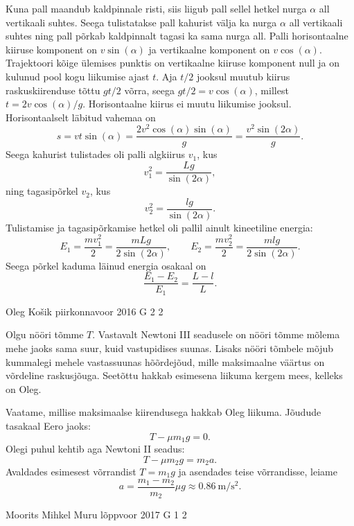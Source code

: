 \documentclass[11pt, twoside]{article}
\begin{document}
{{\ifSolution
Kuna pall maandub kaldpinnale risti, siis liigub pall sellel hetkel nurga $\alpha$ all vertikaali suhtes. Seega tulistatakse pall kahurist välja ka nurga $\alpha$ all vertikaali suhtes ning pall põrkab kaldpinnalt tagasi ka sama nurga all. Palli horisontaalne kiiruse komponent on $v\sin(\alpha)$ ja vertikaalne komponent on $v\cos(\alpha)$. Trajektoori kõige ülemises punktis on vertikaalne kiiruse komponent null ja on kulunud pool kogu liikumise ajast $t$. Aja $t/2$ jooksul muutub kiirus raskuskiirenduse tõttu $gt/2$ võrra, seega $gt/2 =v\cos(\alpha)$, millest $t=2v\cos(\alpha)/g$. Horisontaalne kiirus ei muutu liikumise jooksul. Horisontaalselt läbitud vahemaa on $$s=vt\sin(\alpha)=\frac{2v^2\cos(\alpha)\sin(\alpha)}{g} = \frac{v^2\sin(2\alpha)}{g}.$$
Seega kahurist tulistades oli palli algkiirus $v_1$, kus
\[ v_1^2 = \frac{Lg}{\sin(2\alpha)}, \]
ning tagasipõrkel $v_2$, kus
\[ v_2^2 = \frac{lg}{\sin(2\alpha)}. \]
Tulistamise ja tagasipõrkamise hetkel oli pallil ainult kineetiline energia:
\[ E_1 = \frac{mv_1^2}{2}=\frac{mLg}{2\sin(2\alpha)},\quad\quad E_2 =\frac{mv_2^2}{2} = \frac{mlg}{2\sin(2\alpha)}. \]
Seega põrkel kaduma läinud energia osakaal on
\[ \frac{E_1-E_2}{E_1} = \frac{L-l}{L}. \]
\fi
}

{Oleg Košik} %
{piirkonnavoor} %
{2016} %
{G 2} %
{2} %
{

\ifSolution
Olgu nööri tõmme $T$. Vastavalt Newtoni III seadusele on nööri tõmme mõlema mehe jaoks sama suur, kuid vastupidises suunas. Lisaks nööri tõmbele mõjub kummalegi mehele vastassuunas hõõrdejõud, mille maksimaalne väärtus on võrdeline raskusjõuga. Seetõttu hakkab esimesena liikuma kergem mees, kelleks on Oleg.

Vaatame, millise maksimaalse kiirendusega hakkab Oleg liikuma.
Jõudude tasakaal Eero jaoks:
\[
T-\mu m_1g = 0.
\]
Olegi puhul kehtib aga Newtoni II seadus:
\[
T-\mu m_2g = m_2a.
\]
Avaldades esimesest võrrandist $T=m_1g$ ja asendades teise võrrandisse, leiame
\[
a = \frac{m_1-m_2}{m_2}\mu g \approx \SI{0,86}{\meter \per \second\squared}.
\]
\fi
}

{Moorits Mihkel Muru} %
{lõppvoor} %
{2017} %
{G 1} %
{2} %
{

}}
\end{document}
